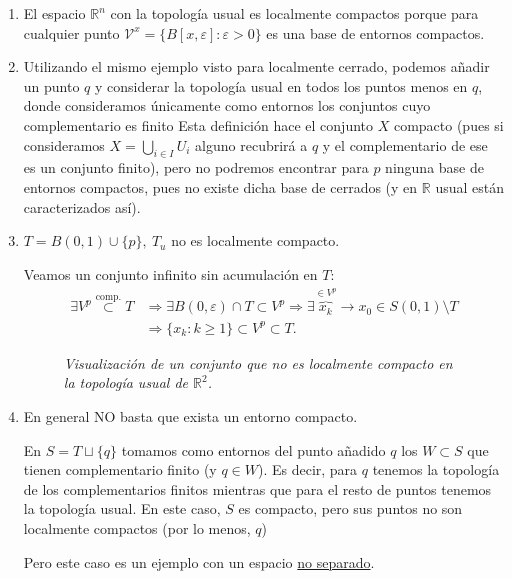 \begin{ej}
\begin{enumerate}
    \item El espacio $\mathbb{R}^n$ con la topología usual es localmente compactos porque para cualquier punto $\mathcal{V}^x = \{B\left[ x, \varepsilon \right] : \varepsilon > 0\}$ es una base de entornos compactos.
    
    \item Utilizando el mismo ejemplo visto para localmente cerrado, podemos añadir un punto $q$ y considerar la topología usual en todos los puntos menos en $q$, donde consideramos únicamente como entornos los conjuntos cuyo complementario es finito
    Esta definición hace el conjunto $X$ compacto (pues si consideramos $X=\bigcup_{i\in I} U_i$ alguno recubrirá a $q$ y el complementario de ese es un conjunto finito), pero no podremos encontrar para $p$ ninguna base de entornos compactos, pues no existe dicha base de cerrados (y en $\mathbb{R}$ usual están caracterizados así).

    \item $T = B\left( 0, 1 \right) \cup \{p\},\ T_u$ no es localmente compacto.
    \begin{demo}
    Veamos un conjunto infinito sin acumulación en $T$:
    \begin{align*}
        \exists V^p \stackrel{\text{comp.}}{\subset} T &\Rightarrow \exists B\left( 0, \varepsilon \right) \cap T \subset V^p \Rightarrow \exists \overbrace{x_k}^{\in V^p} \rightarrow x_0 \in S\left( 0, 1 \right) \setminus T\\
       &\Rightarrow \{x_k : k \ge 1\} \subset V^p \subset T 
    .\end{align*}
    \end{demo}

    \begin{figure}[H]
        \centering
        \caption{\textit{Visualización de un conjunto que no es localmente compacto en la topología usual de $\mathbb{R}^2$.}}
        \label{fig:usual-no-localmente-compacto}
    \end{figure}

    \item En general NO basta que exista un entorno compacto.

    En $S = T \sqcup \{q\}$ tomamos como entornos del punto añadido $q$ los $W \subset S$ que tienen complementario finito (y $q \in W$). 
    Es decir, para $q$ tenemos la topología de los complementarios finitos mientras que para el resto de puntos tenemos la topología usual.
    En este caso, $S$ es compacto, pero sus puntos no son localmente compactos (por lo menos, $q$)

    Pero este caso es un ejemplo con un espacio \underline{no separado}.
\end{enumerate}
\end{ej}

